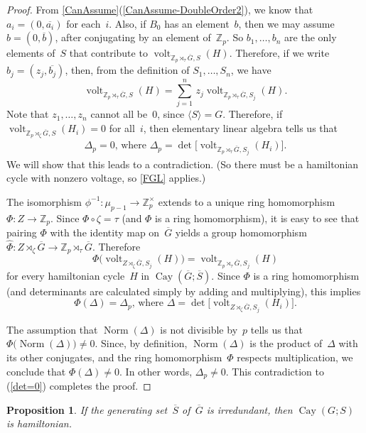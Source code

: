 \documentclass[]{amcjoucc}
\newcommand{\pref}[1]{(\ref{#1})}
\newcommand{\fullcref}[2]{\cref{#1}\pref{#1-#2}}
\theoremstyle{plain}
\newtheorem{prop}[equation]{Proposition}
\theoremstyle{definition}
\theoremstyle{definition}
\DeclareMathOperator{\Cay}{Cay}
\DeclareMathOperator{\norm}{Norm}
\DeclareMathOperator{\volt}{volt}
\newcommand{\quot}{\overline}
\newcommand{\ZZ}{\mathbb{Z}}
\begin{document}
\begin{proof}
From \fullcref{CanAssume}{DoubleOrder2}, we know that $a_i = (0, \quot{a_i})$ for each~$i$. Also, if $B_0$ has an element~$b$, then we may assume $b = (0, \quot b)$, after conjugating by an element of~$\ZZ_p$. So $b_1,\ldots,b_n$ are the only elements of~$S$ that contribute to $\volt_{\ZZ_p \rtimes_\tau \quot G, S}(H)$. Therefore, if we write $b_j = (z_j, \quot{b_j})$, then, from the definition of $S_1,\ldots,S_n$, we have
	$$ \volt_{\ZZ_p \rtimes_\tau \quot G, S}(H)
		= \sum_{j=1}^n \, z_j   \volt_{\ZZ_p \rtimes_\tau \quot G, S_j}(H) . $$
Note that $z_1,\ldots,z_n$ cannot all be~$0$, since $\langle S \rangle = G$. 
Therefore, if $\volt_{\ZZ_p \rtimes_\zeta \quot G, S}(H_i) = 0$ for all~$i$, then elementary linear algebra tells us that
	\begin{align} \label{det=0} \tag{$*$}
	\text{$\Delta_p = 0$, where $\Delta_p = 
	 \det \bigl[ \volt_{\ZZ_p \rtimes_\tau \quot G, S_j}(H_i) \bigr]$}
	 . \end{align}
We will show that this leads to a contradiction. (So there must be a hamiltonian cycle with nonzero voltage, so \cref{FGL} applies.)

The isomorphism $\phi^{-1}\colon \mu_{p-1} \to \ZZ_p^\times$ extends to a unique ring homomorphism $\Phi \colon Z \to \ZZ_p$. Since $\Phi \circ \zeta = \tau$ (and $\Phi$ is a ring homomorphism), it is easy to see that pairing $\Phi$ with the identity map on~$\quot G$ yields a group homomorphism $\widehat \Phi \colon Z \rtimes_\zeta \quot G \to \ZZ_p \rtimes_\tau \quot G$. Therefore
	$$ \Phi \bigl( \volt_{Z \rtimes_\zeta \quot G, S_j}(H) \bigr) = \volt_{\ZZ_p \rtimes_\tau \quot G, S_j}(H) $$
for every hamiltonian cycle~$H$ in $\Cay(\quot G; \quot S)$. Since $\Phi$ is a ring homomorphism (and determinants are calculated simply by adding and multiplying), this implies
	$$ \text{$\Phi(\Delta) = \Delta_p$, where $\Delta = \det \bigl[ \volt_{Z \rtimes_\zeta \quot G, S_j}(H_i) \bigr]$} .$$

The assumption that $\norm (\Delta)$ is not divisible by~$p$ tells us that $\Phi \bigl( \norm (\Delta) \bigr)\neq 0$. Since, by definition, $\norm (\Delta)$ is the product of~$\Delta$ with its other conjugates, and the ring homomorphism~$\Phi$ respects multiplication, we conclude that $\Phi(\Delta) \neq 0$. In other words, $\Delta_p \neq 0$. This contradiction to \pref{det=0} completes the proof.
\end{proof}

\begin{prop} \label{ApplyVoltageMatrix}
If the generating set~$\quot S$ of~$\quot G$ is irredundant, then $\Cay(G;S)$ is hamiltonian.
\end{prop}
\end{document}

